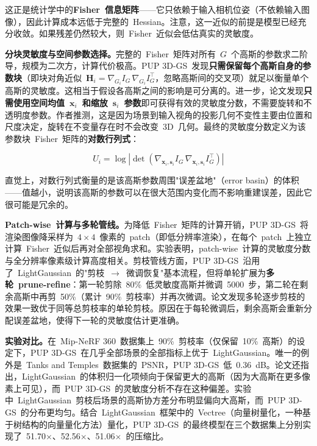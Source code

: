 这正是统计学中的\textbf{Fisher~信息矩阵}——它只依赖于输入相机位姿（不依赖输入图像），因此计算成本远低于完整的~Hessian。注意，这一近似的前提是模型已经充分收敛。如果残差仍然较大，则~Fisher~近似会低估真实的灵敏度。

\textbf{分块灵敏度与空间参数选择。}完整的~Fisher~矩阵对所有~$G$~个高斯的参数求二阶导，规模为二次方，计算代价极高。PUP 3D-GS~发现\textbf{只需保留每个高斯自身的参数块}（即块对角近似~$\mathbf{H}_i = \nabla_{G_i} I_G\, \nabla_{G_i} I_G^\top$，忽略高斯间的交叉项）就足以衡量单个高斯的灵敏度。这相当于假设各高斯之间的影响是可分离的。进一步，论文发现\textbf{只需使用空间均值~$\mathbf{x}_i$~和缩放~$\mathbf{s}_i$~参数}即可获得有效的灵敏度分数，不需要旋转和不透明度参数。作者推测，这是因为场景到输入视角的投影几何不变性主要由位置和尺度决定，旋转在不变量存在时不会改变~3D~几何。最终的灵敏度分数定义为该参数块~Fisher~矩阵的\textbf{对数行列式}：

\begin{equation}
U_i = \log|\det(\nabla_{\mathbf{x}_i, \mathbf{s}_i} I_G\, \nabla_{\mathbf{x}_i, \mathbf{s}_i} I_G^\top)|
\end{equation}

直觉上，对数行列式衡量的是该高斯参数周围"误差盆地"（error basin）的体积——值越小，说明该高斯的参数可以在很大范围内变化而不影响重建误差，因此它很可能是冗余的。

\textbf{Patch-wise~计算与多轮管线。}为降低~Fisher~矩阵的计算开销，PUP 3D-GS~将渲染图像降采样为~$4\times4$~像素的~patch（即低分辨率渲染），在每个~patch~上独立计算~Fisher~近似后再对全部视角求和。实验表明，patch-wise~计算的灵敏度分数与全分辨率像素级计算高度相关。剪枝管线方面，PUP 3D-GS~沿用了~LightGaussian~的"剪枝~$\to$~微调恢复"基本流程，但将单轮扩展为\textbf{多轮~prune-refine}：第一轮剪除~80\%~低灵敏度高斯并微调~5000~步，第二轮在剩余高斯中再剪~50\%（累计~90\%~剪枝率）并再次微调。论文发现多轮逐步剪枝的效果一致优于同等总剪枝率的单轮剪枝。原因在于每轮微调后，剩余高斯会重新分配误差盆地，使得下一轮的灵敏度估计更准确。

\textbf{实验对比。}在~Mip-NeRF 360~数据集上~90\%~剪枝率（仅保留~10\%~高斯）的设定下，PUP 3D-GS~在几乎全部场景的全部指标上优于~LightGaussian。唯一的例外是~Tanks and Temples~数据集的~PSNR，PUP 3D-GS~低~0.36~dB。论文还指出，LightGaussian~的体积归一化项倾向于保留更大的高斯（因为大高斯在更多像素上可见），而~PUP 3D-GS~的灵敏度分析不存在这种偏差。实验中~LightGaussian~剪枝后场景的高斯协方差分布明显偏向大高斯，而~PUP 3D-GS~的分布更均匀。结合~LightGaussian~框架中的~Vectree（向量树量化，一种基于树结构的向量量化方法）量化，PUP 3D-GS~的最终模型在三个数据集上分别实现了~51.70$\times$、52.56$\times$、51.06$\times$~的压缩比。

